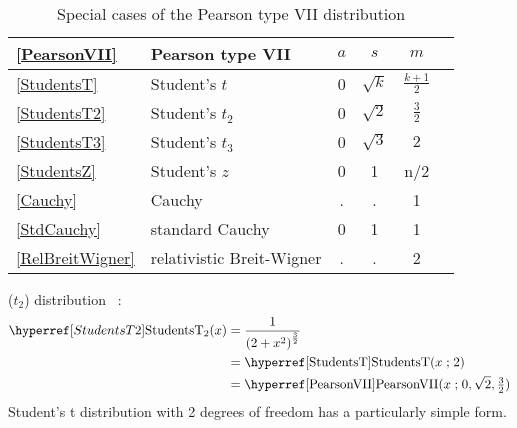 \begin{table*}[tp]
\begin{center}
\caption[Pearson VII distribution -- Special cases]{Special cases of the Pearson type VII distribution}
~\\
{\renewcommand{\arraystretch}{1.25}
\begin{tabular}{llcccl}
\eqref{PearsonVII}&Pearson type VII & $a$ & $s$ & $m$  &  \\
 \hline
\eqref{StudentsT}& Student's $t$		& 0	& $\sqrt{k}$ & $\tfrac{k+1}{2}$  \\
\eqref{StudentsT2}& Student's $t_2$		& 0	& $\sqrt{2}$ & $\tfrac{3}{2}$  \\
\eqref{StudentsT3}& Student's $t_3$		& 0	& $\sqrt{3}$ & $2$  \\
\eqref{StudentsZ}& Student's $z$             	& 0 & 1&  n/2  \\
\eqref{Cauchy} &Cauchy 			& . & . & 1  \\
\eqref{StdCauchy} &standard Cauchy 			& 0 & 1 & 1  \\
\eqref{RelBreitWigner}& relativistic Breit-Wigner  & . & . & 2 \\
\end{tabular} }
\end{center}
\end{table*}




 ($t_2$) distribution~\cite{Jones2002} :
\begin{align}
\label{StudentsT2}
\StudentsTT(x) 
&= \frac{1}{\Left( 2 + x^2 \Right)^{\frac{3}{2} } } \checked
\\ \notag 
& = \opr{StudentsT}(x\given 2) \checked
\\ \notag
&= \opr{PearsonVII}(x\given 0,\sqrt{2},\tfrac{3}{2}) \checked
\end{align}
Student's t distribution with 2 degrees of freedom has a particularly simple form. 

